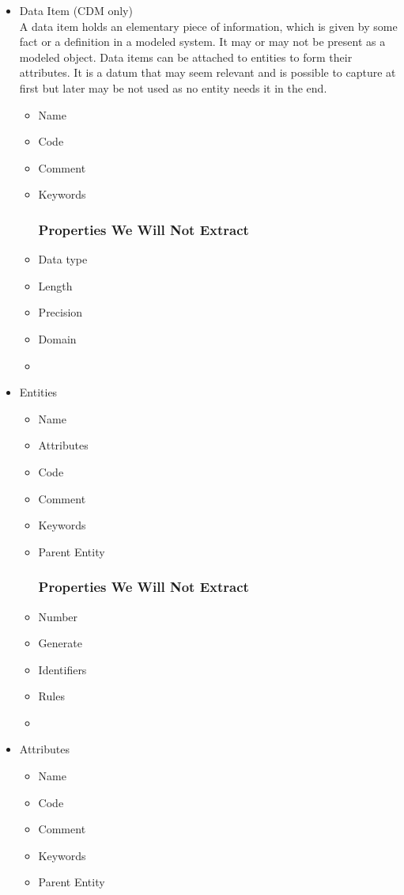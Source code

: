 \begin{itemize}
	\item Data Item (CDM only) \\
	A data item holds an elementary piece of information, which is given by some fact or a definition in a modeled system. It may or may not be present as a modeled object. Data items can be attached to entities to form their attributes. It is a datum that may seem relevant and is possible to capture at first but later may be not used as no entity needs it in the end.
	\begin{itemize}
		\item Name 
		\item Code 
		\item Comment
		\item Keywords
		\subsubsection{Properties We Will Not Extract}
		\item Data type
		\item Length
		\item Precision
		\item Domain
		\item {}
	\end{itemize}
	\item Entities
	\begin{itemize}
		\item Name 
		\item Attributes
		\item Code 
		\item Comment
		\item Keywords
		\item Parent Entity
		\subsubsection{Properties We Will Not Extract}
		\item Number
		\item Generate
		\item Identifiers
		\item Rules
		\item {}
	\end{itemize}
	\item Attributes
	\begin{itemize}
		\item Name 
		\item Code 
		\item Comment
		\item Keywords
		\item Parent Entity

\end{itemize}
\end{itemize}
